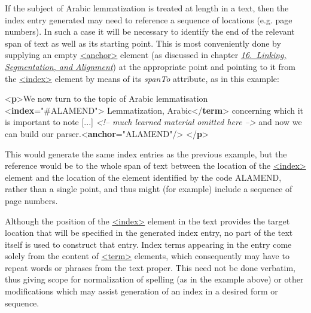 If the subject of Arabic lemmatization is treated at length in a text, then the index entry generated may need to reference a sequence of locations (e.g. page numbers). In such a case it will be necessary to identify the end of the relevant span of text as well as its starting point. This is most conveniently done by supplying an empty \hyperref[TEI.anchor]{<anchor>} element (as discussed in chapter \textit{\hyperref[SA]{16.\ Linking, Segmentation, and Alignment}}) at the appropriate point and pointing to it from the \hyperref[TEI.index]{<index>} element by means of its {\itshape spanTo} attribute, as in this example: \par\bgroup{}\exampleFont \begin{shaded}\noindent\mbox{}{<\textbf{p}>}We now turn to the\mbox{}\newline 
 topic of Arabic lemmatisation\mbox{}\newline 
{<\textbf{index}\hspace*{1em}{spanTo}="{\#ALAMEND}">}\mbox{}\newline 
\hspace*{1em}Lemmatization, Arabic{</\textbf{term}>}\mbox{}\newline 
{} concerning which it is important to note [...]\mbox{}\newline 
\mbox{}\newline 
\textit{<!-- much learned material omitted here -->}\mbox{}\newline 
 and now we can build our parser.{<\textbf{anchor}\hspace*{1em}{xml:id}="{ALAMEND}"/>}\mbox{}\newline 
{</\textbf{p}>}\end{shaded}\egroup\par \par
This would generate the same index entries as the previous example, but the reference would be to the whole span of text between the location of the \hyperref[TEI.index]{<index>} element and the location of the element identified by the code \textsf{ALAMEND}, rather than a single point, and thus might (for example) include a sequence of page numbers.\par
Although the position of the \hyperref[TEI.index]{<index>} element in the text provides the target location that will be specified in the generated index entry, no part of the text itself is used to construct that entry. Index terms appearing in the entry come solely from the content of \hyperref[TEI.term]{<term>} elements, which consequently may have to repeat words or phrases from the text proper. This need not be done verbatim, thus giving scope for normalization of spelling (as in the example above) or other modifications which may assist generation of an index in a desired form or sequence.\par
